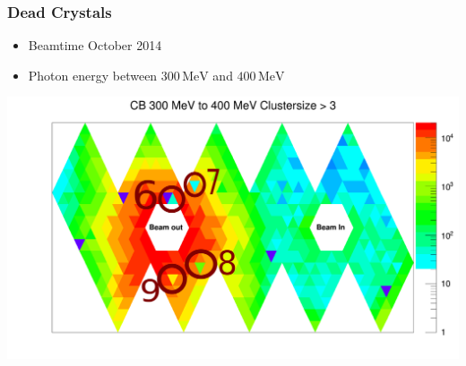 \documentclass[slidestop,compress,mathserif]{beamer}
\begin{document}
\begin{frame}
	\frametitle{Dead Crystals}
	\begin{itemize}
		\item Beamtime October 2014
		\item Photon energy between $300\,\text{MeV}$ and $400\,\text{MeV}$
	\end{itemize}

		\begin{table}[ht]
			\begin{minipage}[b]{0.5\linewidth}
				\centering
				\includegraphics[width=1.0\textwidth]{Pictures/20172504StrahlzeitMoreDead}
				\caption{Beamtime: Probably Dead Crystals in CB Map}

			\end{minipage}
		\hfill
			\begin{minipage}[b]{0.45\linewidth}
				\centering
\end{minipage}
\end{table}
\end{frame}
\end{document}
